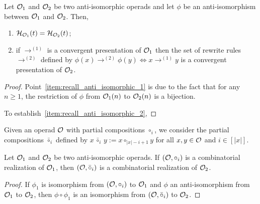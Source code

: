 \begin{Proposition} \label{prop:recall_anti_isomorphic}
  Let $\mathcal{O}_1$ and $\mathcal{O}_2$ be two anti-isomorphic operads and let
  $\phi$ be an anti-isomorphism between $\mathcal{O}_1$ and $\mathcal{O}_2$. Then,
    \begin{enumerate}[label={(\it\roman*)}]
        \item \label{item:recall_anti_isomorphic_1}
        $\mathcal{H}_{\mathcal{O}_1}(t) = \mathcal{H}_{\mathcal{O}_2}(t)$;
        \item \label{item:recall_anti_isomorphic_2}
        if $\rightarrow^{(1)}$ is a convergent presentation of
        $\mathcal{O}_1$
        then the set of rewrite rules $\rightarrow^{(2)}$ defined by
        \begin{math}
          \phi(x) \rightarrow^{(2)} \phi(y) \iff x \rightarrow^{(1)} y
        \end{math}
        is a convergent presentation of $\mathcal{O}_2$.
    \end{enumerate}
\end{Proposition}
\begin{proof}
  Point~\ref{item:recall_anti_isomorphic_1} is due to the fact that for
  any $n \geq 1$, the restriction of $\phi$ from $\mathcal{O}_1(n)$ to
  $\mathcal{O}_2(n)$ is a bijection.
  \smallbreak

    To establish~\ref{item:recall_anti_isomorphic_2},
\end{proof}
\medbreak

Given an operad $\mathcal{O}$ with partial compositions $\circ_i$, we consider
the partial compositions $\bar{\circ}_i$ defined by
\begin{math}
  x \, \bar{\circ}_i \, y := x \circ_{|x| - i + 1} y
\end{math}
for all $x, y \in \mathcal{O}$ and $i \in [|x|]$.

\begin{Proposition} \label{prop:realization_anti_isomorphic}
    Let $\mathcal{O}_1$ and $\mathcal{O}_2$ be two anti-isomorphic operads. If
    $\left(\mathcal{O}, \circ_i\right)$ is a combinatorial realization of
    $\mathcal{O}_1$, then
    \begin{math}
        \left(\mathcal{O}, \bar{\circ}_i\right)
    \end{math}
    is a combinatorial realization of $\mathcal{O}_2$.
    
\end{Proposition}
\begin{proof}
  If $\phi_1$ is isomorphism from $(\mathcal{O}, \circ_i)$ to
  $\mathcal{O}_1$ and $\phi$ an anti-isomorphism from $\mathcal{O}_1$ to $\mathcal{O}_2$,
  then $\phi \circ \phi_1$ is an isomorphism from
  $(\mathcal{O}, \bar{\circ}_i)$ to $\mathcal{O}_2$.
\end{proof}
\medbreak

